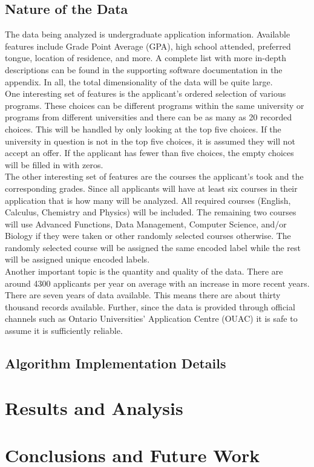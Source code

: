 \documentclass[titlepage]{article}
\begin{document}
\subsection{Nature of the Data}
The data being analyzed is undergraduate application information. Available features include Grade Point Average (GPA), high school attended, preferred tongue, location of residence, and more. A complete list with more in-depth descriptions can be found in the supporting software documentation in the appendix. In all, the total dimensionality of the data will be quite large.\\
One interesting set of features is the applicant's ordered selection of various programs. These choices can be different programs within the same university or programs from different universities and there can be as many as 20 recorded choices. This will be handled by only looking at the top five choices. If the university in question is not in the top five choices, it is assumed they will not accept an offer. If the applicant has fewer than five choices, the empty choices will be filled in with zeros.\\
The other interesting set of features are the courses the applicant's took and the corresponding grades. Since all applicants will have at least six courses in their application that is how many will be analyzed. All required courses (English, Calculus, Chemistry and Physics) will be included. The remaining two courses will use Advanced Functions, Data Management, Computer Science, and/or Biology if they were taken or other randomly selected courses otherwise. The randomly selected course will be assigned the same encoded label while the rest will be assigned unique encoded labels.\\
Another important topic is the quantity and quality of the data. There are around 4300 applicants per year on average with an increase in more recent years. There are seven years of data available. This means there are about thirty thousand records available. Further, since the data is provided through official channels such as Ontario Universities' Application Centre (OUAC) it is safe to assume it is sufficiently reliable.

\subsection{Algorithm Implementation Details}



\section{Results and Analysis}%



\section{Conclusions and Future Work}%


\newpage
\nocite{*}
\printbibliography
\end{document}
